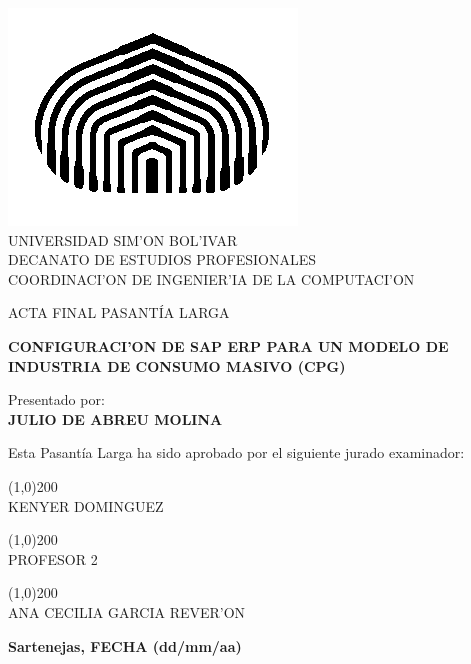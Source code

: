 \begin{titlepage}
\begin{center}

\includegraphics[scale=0.5,type=png,ext=.png,read=.png]{figures/cebolla} \\

\textsc {\large UNIVERSIDAD SIM'ON BOL'IVAR} \\
\textsc{DECANATO DE ESTUDIOS PROFESIONALES\\
COORDINACI'ON DE INGENIER'IA DE LA COMPUTACI'ON}

\bigskip
\bigskip
\bigskip
\bigskip
\bigskip
\bigskip

\textsc{ACTA FINAL PASANT\'IA LARGA}

\bigskip
\bigskip

\textsc{\bfseries CONFIGURACI'ON DE SAP ERP PARA UN MODELO DE INDUSTRIA DE CONSUMO MASIVO (CPG)}

\bigskip
\bigskip
\bigskip
\bigskip

\begin{minipage}{\textwidth}
\centering
Presentado por: \\
\textsc{\bfseries JULIO DE ABREU MOLINA} \\

\bigskip
\bigskip
\bigskip
\bigskip

Esta Pasant\'ia Larga ha sido aprobado por el siguiente jurado examinador: \\

\bigskip
\bigskip

\line(1,0){200} \\
KENYER DOMINGUEZ\\

\bigskip
\bigskip

\line(1,0){200} \\
PROFESOR 2 \\

\bigskip
\bigskip

\line(1,0){200} \\
ANA CECILIA GARCIA REVER'ON \\
\end{minipage}

\bigskip
\bigskip
\vfill

{\large \bfseries Sartenejas, FECHA (dd/mm/aa)}

\end{center}
\end{titlepage}
